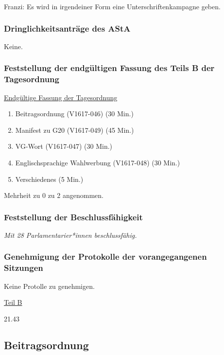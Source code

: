 \documentclass[ngerman,headheight=70pt]{scrartcl}
\begin{document}
    Franzi:
    Es wird in irgendeiner Form eine Unterschriftenkampagne geben.

    \subsubsection{Dringlichkeitsanträge des AStA}

    Keine.

    \subsubsection{Feststellung der endgültigen Fassung des Teils B der Tagesordnung}

    \newpage
    \underline{Endgültige Fassung der Tagesordnung}
    \begin{enumerate}[label={\textbf{Top \theenumi}},leftmargin=*]
        \item Beitragsordnung (V1617-046) (30 Min.)
        \item Manifest zu G20 (V1617-049) (45 Min.)
        \item VG-Wort (V1617-047) (30 Min.)
        \item Englischsprachige Wahlwerbung (V1617-048) (30 Min.)
        \item Verschiedenes (5 Min.)
    \end{enumerate}

    Mehrheit zu 0 zu 2 angenommen.

    \subsubsection{Feststellung der Beschlussfähigkeit}

    \textit{Mit 28 Parlamentarier*innen beschlussfähig.}

    \subsubsection{Genehmigung der Protokolle der vorangegangenen Sitzungen}

    Keine Protolle zu genehmigen.

    \vspace{0.5cm}
    {\Large \underline{Teil B}}

    21.43

    \subsection{Beitragsordnung}
\end{document}
